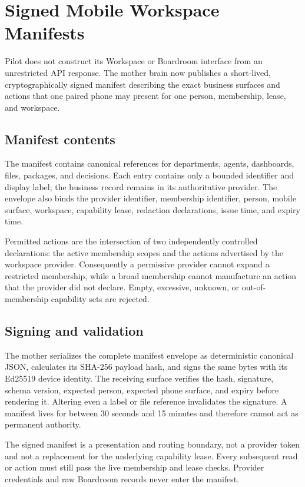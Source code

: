 \section{Signed Mobile Workspace Manifests}
\label{sec:pilot-mobile-signed-workspace-manifest}

Pilot does not construct its Workspace or Boardroom interface from an unrestricted API
response.  The mother brain now publishes a short-lived, cryptographically signed
manifest describing the exact business surfaces and actions that one paired phone may
present for one person, membership, lease, and workspace.

\subsection{Manifest contents}

The manifest contains canonical references for departments, agents, dashboards, files,
packages, and decisions.  Each entry contains only a bounded identifier and display
label; the business record remains in its authoritative provider.  The envelope also
binds the provider identifier, membership identifier, person, mobile surface, workspace,
capability lease, redaction declarations, issue time, and expiry time.

Permitted actions are the intersection of two independently controlled declarations:
the active membership scopes and the actions advertised by the workspace provider.
Consequently a permissive provider cannot expand a restricted membership, while a broad
membership cannot manufacture an action that the provider did not declare.  Empty,
excessive, unknown, or out-of-membership capability sets are rejected.

\subsection{Signing and validation}

The mother serializes the complete manifest envelope as deterministic canonical JSON,
calculates its SHA-256 payload hash, and signs the same bytes with its Ed25519 device
identity.  The receiving surface verifies the hash, signature, schema version, expected
person, expected phone surface, and expiry before rendering it.  Altering even a label or
file reference invalidates the signature.  A manifest lives for between 30 seconds and
15 minutes and therefore cannot act as permanent authority.

The signed manifest is a presentation and routing boundary, not a provider token and not
a replacement for the underlying capability lease.  Every subsequent read or action
must still pass the live membership and lease checks.  Provider credentials and raw
Boardroom records never enter the manifest.

